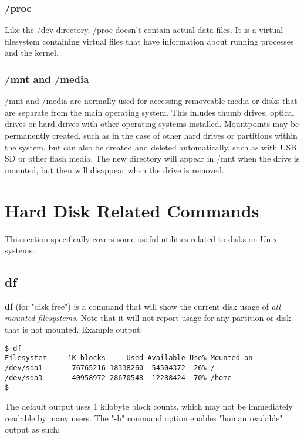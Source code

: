 \subsubsection{/proc}

Like the /dev directory, /proc doesn't contain actual data files.  It is a virtual filesystem containing virtual files that have information about running processes and the kernel.

\subsubsection{/mnt and /media}

/mnt and /media are normally used for accessing removeable media or disks that are separate from the main operating system.  This inludes thumb drives, optical drives or hard drives with other operating systems installed.  Mountpoints may be permanently created, such as in the case of other hard drives or partitions within the system, but can also be created and deleted automatically, such as with USB, SD or other flash media.  The new directory will appear in /mnt when the drive is mounted, but then will disappear when the drive is removed.

\section{Hard Disk Related Commands}

This section specifically covers some useful utilities related to disks on Unix systems.

\subsection{df}

\textbf{df} (for "disk free") is a command that will show the current disk usage of \textit{all mounted filesystems}.  Note that it will not report usage for any partition or disk that is not mounted.  Example output:

\begin{verbatim}
$ df
Filesystem     1K-blocks     Used Available Use% Mounted on
/dev/sda1       76765216 18338260  54504372  26% /
/dev/sda3       40958972 28670548  12288424  70% /home
$
\end{verbatim}

The default output uses 1 kilobyte block counts, which may not be immediately readable by many users.  The "-h" command option enables "human readable" output as such:

